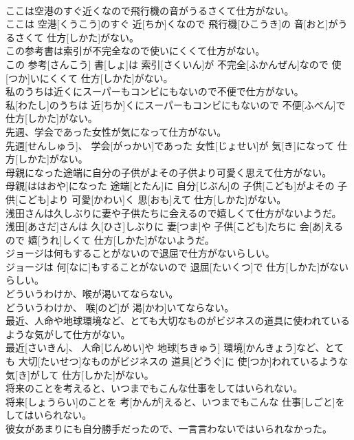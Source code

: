 \documentclass[8pt]{extreport}
\begin{document}
\begin{CJK}{UTF8}{min}
\\	ここは空港のすぐ近くなので飛行機の音がうるさくて仕方がない。	
\\	ここは 空港[くうこう]のすぐ 近[ちか]くなので 飛行機[ひこうき]の 音[おと]がうるさくて 仕方[しかた]がない。
\\	この参考書は索引が不完全なので使いにくくて仕方がない。	
\\	この 参考[さんこう] 書[しょ]は 索引[さくいん]が 不完全[ふかんぜん]なので 使[つか]いにくくて 仕方[しかた]がない。
\\	私のうちは近くにスーパーもコンビにもないので不便で仕方がない。	
\\	私[わたし]のうちは 近[ちか]くにスーパーもコンビにもないので 不便[ふべん]で 仕方[しかた]がない。
\\	先週、学会であった女性が気になって仕方がない。	
\\	先週[せんしゅう]、 学会[がっかい]であった 女性[じょせい]が 気[き]になって 仕方[しかた]がない。
\\	母親になった途端に自分の子供がよその子供より可愛く思えて仕方がない。	
\\	母親[ははおや]になった 途端[とたん]に 自分[じぶん]の 子供[こども]がよその 子供[こども]より 可愛[かわい]く 思[おも]えて 仕方[しかた]がない。
\\	浅田さんは久しぶりに妻や子供たちに会えるので嬉しくて仕方がないようだ。	
\\	浅田[あさだ]さんは 久[ひさ]しぶりに 妻[つま]や 子供[こども]たちに 会[あ]えるので 嬉[うれ]しくて 仕方[しかた]がないようだ。
\\	ジョージは何もすることがないので退屈で仕方がないらしい。	
\\	ジョージは 何[なに]もすることがないので 退屈[たいくつ]で 仕方[しかた]がないらしい。
\\	どういうわけか、喉が渇いてならない。	
\\	どういうわけか、 喉[のど]が 渇[かわ]いてならない。
\\	最近、人命や地球環境など、とても大切なものがビジネスの道具に使われているような気がして仕方がない。	
\\	最近[さいきん]、 人命[じんめい]や 地球[ちきゅう] 環境[かんきょう]など、とても 大切[たいせつ]なものがビジネスの 道具[どうぐ]に 使[つか]われているような 気[き]がして 仕方[しかた]がない。
\\	将来のことを考えると、いつまでもこんな仕事をしてはいられない。	
\\	将来[しょうらい]のことを 考[かんが]えると、いつまでもこんな 仕事[しごと]をしてはいられない。
\\	彼女があまりにも自分勝手だったので、一言言わないではいられなかった。	

\end{CJK}
\end{document}
